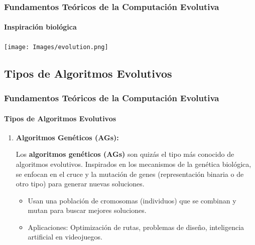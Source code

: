 \documentclass[
	11pt, %
]{beamer}
\begin{document}
\begin{frame}
	\frametitle{Fundamentos Teóricos de la Computación Evolutiva}
	\framesubtitle{Inspiración biológica}
        \begin{center}
            \texttt{[image: Images/evolution.png]}
        \end{center}
\end{frame}

\subsection{Tipos de Algoritmos Evolutivos}
\begin{frame}
    \frametitle{Fundamentos Teóricos de la Computación Evolutiva}
    \framesubtitle{Tipos de Algoritmos Evolutivos}
    \begin{enumerate}
        \item \textbf{Algoritmos Genéticos (AGs):}
        
        Los \textbf{algoritmos genéticos (AGs)} son quizás el tipo más conocido de algoritmos evolutivos. Inspirados en los mecanismos de la genética biológica, se enfocan en el cruce y la mutación de genes (representación binaria o de otro tipo) para generar nuevas soluciones.
        
        \begin{itemize}
            \item Usan una población de cromosomas (individuos) que se combinan y mutan para buscar mejores soluciones.
            \item Aplicaciones: Optimización de rutas, problemas de diseño, inteligencia artificial en videojuegos.
        \end{itemize}
    \end{enumerate}
\end{frame}
\end{document}
